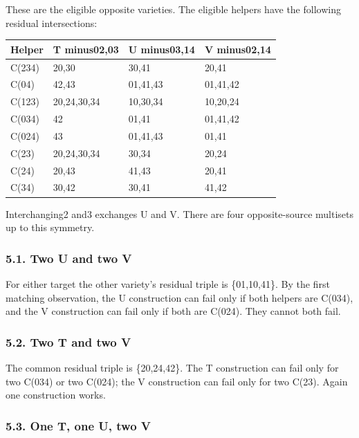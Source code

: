 \documentclass[
  10pt,
]{article}
\begin{document}
These are the eligible opposite varieties. The eligible helpers have the
following residual intersections:

\begin{longtable}[]{@{}llll@{}}
\toprule\noalign{}
Helper & T minus02,03 & U minus03,14 & V minus02,14 \\
\midrule\noalign{}
\endhead
\bottomrule\noalign{}
\endlastfoot
C(234) & 20,30 & 30,41 & 20,41 \\
C(04) & 42,43 & 01,41,43 & 01,41,42 \\
C(123) & 20,24,30,34 & 10,30,34 & 10,20,24 \\
C(034) & 42 & 01,41 & 01,41,42 \\
C(024) & 43 & 01,41,43 & 01,41 \\
C(23) & 20,24,30,34 & 30,34 & 20,24 \\
C(24) & 20,43 & 41,43 & 20,41 \\
C(34) & 30,42 & 30,41 & 41,42 \\
\end{longtable}

Interchanging2 and3 exchanges U and V. There are four opposite-source
multisets up to this symmetry.

\hypertarget{two-u-and-two-v}{%
\subsubsection*{5.1. Two U and two V}\label{two-u-and-two-v}}

For either target the other variety's residual triple is \{01,10,41\}.
By the first matching observation, the U construction can fail only if
both helpers are C(034), and the V construction can fail only if both
are C(024). They cannot both fail.

\hypertarget{two-t-and-two-v}{%
\subsubsection*{5.2. Two T and two V}\label{two-t-and-two-v}}

The common residual triple is \{20,24,42\}. The T construction can fail
only for two C(034) or two C(024); the V construction can fail only for
two C(23). Again one construction works.

\hypertarget{one-t-one-u-two-v}{%
\subsubsection*{5.3. One T, one U, two V}\label{one-t-one-u-two-v}}
\end{document}

